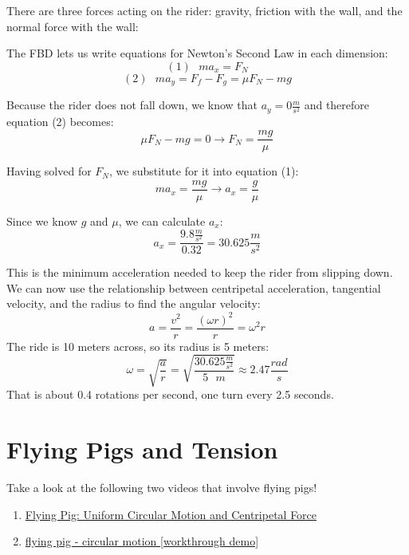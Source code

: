\begin{Answer}[ref = gravitron]
  There are three forces acting on the rider: gravity, friction with the wall, and the normal force with the wall:

  \begin{center}
  \end{center}

  The FBD lets us write equations for Newton's Second Law in each dimension:
  $$\left( 1 \right) \text{ }ma_x = F_N$$
  $$\left( 2 \right) \text{ }ma_y = F_f - F_g = \mu F_N - mg$$

  Because the rider does not fall down, we know that $a_y = 0 \frac{m}{s^2}$ and therefore equation (2) becomes:
  $$\mu F_N - mg = 0 \to F_N = \frac{mg}{\mu}$$

  Having solved for $F_N$, we substitute for it into equation (1):
  $$ma_x = \frac{mg}{\mu} \to a_x = \frac{g}{\mu}$$

  Since we know $g$ and $\mu$, we can calculate $a_x$:
  $$a_x = \frac{9.8 \frac{m}{s^2}}{0.32} = 30.625 \frac{m}{s^2}$$

  This is the minimum acceleration needed to keep the rider from slipping down. We can now use the relationship between centripetal acceleration, tangential velocity, and the radius to find the angular velocity:
  $$a = \frac{v^2}{r} = \frac{\left( \omega r \right)^2}{r} = \omega^2 r$$
  The ride is 10 meters across, so its radius is 5 meters:
  $$\omega = \sqrt{\frac{a}{r}} = \sqrt{\frac{30.625 \frac{m}{s^2}}{5 \text{ } m}} \approx 2.47 \frac{rad}{s}$$
  That is about 0.4 rotations per second, one turn every 2.5 seconds.
\end{Answer}

\section{Flying Pigs and Tension}
Take a look at the following two videos that involve flying pigs!
\begin{enumerate}
  \item \href{https://youtu.be/vsSID5irx4o}{Flying Pig: Uniform Circular Motion and Centripetal Force}
  \item \href{https://www.youtube.com/watch?v=7WO2DZOsYY4}{flying pig - circular motion [workthrough demo]}
\end{enumerate}

